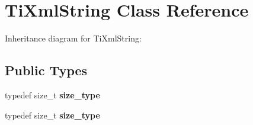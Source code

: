 \hypertarget{class_ti_xml_string}{\section{Ti\+Xml\+String Class Reference}
\label{class_ti_xml_string}
}


Inheritance diagram for Ti\+Xml\+String\+:
\subsection*{Public Types}
\begin{DoxyCompactItemize}
\item 
\hypertarget{class_ti_xml_string_abeb2c1893a04c17904f7c06546d0b971}{typedef size\+\_\+t {\bfseries size\+\_\+type}}\label{class_ti_xml_string_abeb2c1893a04c17904f7c06546d0b971}

\item 
\hypertarget{class_ti_xml_string_abeb2c1893a04c17904f7c06546d0b971}{typedef size\+\_\+t {\bfseries size\+\_\+type}}\label{class_ti_xml_string_abeb2c1893a04c17904f7c06546d0b971}

\end{DoxyCompactItemize}
